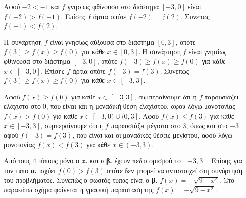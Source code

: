 \documentclass[11pt,a4paper,twoside]{book}
\begin{document}
\begin{alist}
\item Αφού $-2 < -1$ και $f$ γνησίως φθίνουσα στο διάστημα $[-3, 0]$ είναι $f(-2) > f(-1)$.
Επίσης $f$ άρτια οπότε $f(-2) = f(2)$. Συνεπώς $f(-1) < f(2)$.
\item Η συνάρτηση $f$ είναι γνησίως αύξουσα στο διάστημα $[0, 3]$, οπότε $f(3) \ge f(x) \ge f(0)$ για κάθε $x \in [0, 3]$.
Η συνάρτηση $f$ είναι γνησίως φθίνουσα στο διάστημα $[-3, 0]$, οπότε $f(-3) \ge f(x) \ge f(0)$ για κάθε $x \in [-3, 0]$.
Επίσης $f$ άρτια οπότε $f(-3) = f(3)$.
Συνεπώς $f(3) \ge f(x) \ge f(0)$ για κάθε $x \in [-3, 3]$.
\item Αφού $f(x) \ge f(0)$ για κάθε $x \in [-3, 3]$, συμπεραίνουμε ότι η $f$ παρουσιάζει ελάχιστο στο $0$, που είναι και η μοναδική θέση ελαχίστου, αφού λόγω μονοτονίας $f(x) > f(0)$ για κάθε $x \in [-3, 0) \cup (0, 3]$.
Αφού $f(x) \le f(3)$ για κάθε $x \in [-3, 3]$, συμπεραίνουμε ότι η $f$ παρουσιάζει μέγιστο στο $3$, όπως και στο $-3$ αφού $f(-3) = f(3)$, που είναι και οι μοναδικές θέσεις μεγίστου, αφού λόγω μονοτονίας $f(x) < f(3)$ για κάθε $x \in (-3, 3)$.
\item Από τους $4$ τύπους μόνο ο \textbf{α.} και ο \textbf{β.} έχουν πεδίο ορισμού το $[-3, 3]$.
Επίσης για τον τύπο \textbf{α.} ισχύει $f(0) > f(3)$ οπότε δεν μπορεί να αντιστοιχεί στη συνάρτηση του προβλήματος. Συνεπώς ο σωστός τύπος είναι ο \textbf{β.} $f(x) = -\sqrt{9 - x^2}$.
Στο παρακάτω σχήμα φαίνεται η γραφική παράσταση της $f(x) = -\sqrt{9 - x^2}$.
\begin{center}
\end{center}
\end{alist}
\end{document}
